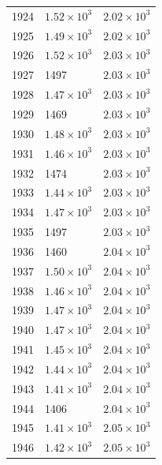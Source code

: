 \begin{table}[H]
\begin{tabular}{lll}
1924 & $\displaystyle 1.52 \times 10^{3}$ & $\displaystyle 2.02 \times 10^{3}$ \\
1925 & $\displaystyle 1.49 \times 10^{3}$ & $\displaystyle 2.02 \times 10^{3}$ \\
1926 & $\displaystyle 1.52 \times 10^{3}$ & $\displaystyle 2.03 \times 10^{3}$ \\
1927 & 1497 & $\displaystyle 2.03 \times 10^{3}$ \\
1928 & $\displaystyle 1.47 \times 10^{3}$ & $\displaystyle 2.03 \times 10^{3}$ \\
1929 & 1469 & $\displaystyle 2.03 \times 10^{3}$ \\
1930 & $\displaystyle 1.48 \times 10^{3}$ & $\displaystyle 2.03 \times 10^{3}$ \\
1931 & $\displaystyle 1.46 \times 10^{3}$ & $\displaystyle 2.03 \times 10^{3}$ \\
1932 & 1474 & $\displaystyle 2.03 \times 10^{3}$ \\
1933 & $\displaystyle 1.44 \times 10^{3}$ & $\displaystyle 2.03 \times 10^{3}$ \\
1934 & $\displaystyle 1.47 \times 10^{3}$ & $\displaystyle 2.03 \times 10^{3}$ \\
1935 & 1497 & $\displaystyle 2.03 \times 10^{3}$ \\
1936 & 1460 & $\displaystyle 2.04 \times 10^{3}$ \\
1937 & $\displaystyle 1.50 \times 10^{3}$ & $\displaystyle 2.04 \times 10^{3}$ \\
1938 & $\displaystyle 1.46 \times 10^{3}$ & $\displaystyle 2.04 \times 10^{3}$ \\
1939 & $\displaystyle 1.47 \times 10^{3}$ & $\displaystyle 2.04 \times 10^{3}$ \\
1940 & $\displaystyle 1.47 \times 10^{3}$ & $\displaystyle 2.04 \times 10^{3}$ \\
1941 & $\displaystyle 1.45 \times 10^{3}$ & $\displaystyle 2.04 \times 10^{3}$ \\
1942 & $\displaystyle 1.44 \times 10^{3}$ & $\displaystyle 2.04 \times 10^{3}$ \\
1943 & $\displaystyle 1.41 \times 10^{3}$ & $\displaystyle 2.04 \times 10^{3}$ \\
1944 & 1406 & $\displaystyle 2.04 \times 10^{3}$ \\
1945 & $\displaystyle 1.41 \times 10^{3}$ & $\displaystyle 2.05 \times 10^{3}$ \\
1946 & $\displaystyle 1.42 \times 10^{3}$ & $\displaystyle 2.05 \times 10^{3}$ \\

\end{tabular}
\end{table}
